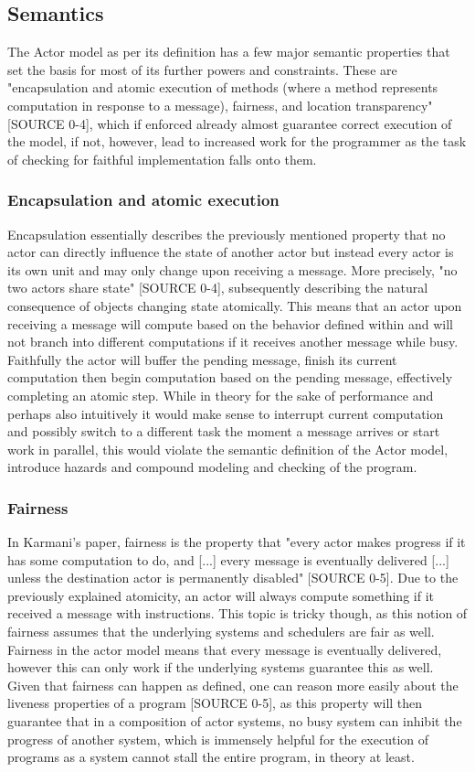 \documentclass[A4]{article}
\begin{document}
\subsection{Semantics}
The Actor model as per its definition has a few major semantic properties that set the basis for most of its further powers and constraints. These are "encapsulation and atomic execution of methods (where a method represents computation in response to a message), fairness, and location transparency" [SOURCE 0-4], which if enforced already almost guarantee correct execution of the model, if not, however, lead to increased work for the programmer as the task of checking for faithful implementation falls onto them. 
\subsubsection{Encapsulation and atomic execution}
Encapsulation essentially describes the previously mentioned property that no actor can directly influence the state of another actor but instead every actor is its own unit and may only change upon receiving a message. More precisely, "no two actors share state" [SOURCE 0-4], subsequently describing the natural consequence of objects changing state atomically. This means that an actor upon receiving a message will compute based on the behavior defined within and will not branch into different computations if it receives another message while busy. Faithfully the actor will buffer the pending message, finish its current computation then begin computation based on the pending message, effectively completing an atomic step. 
While in theory for the sake of performance and perhaps also intuitively it would make sense to interrupt current computation and possibly switch to a different task the moment a message arrives or start work in parallel, this would violate the semantic definition of the Actor model, introduce hazards and compound modeling and checking of the program. 
\subsubsection{Fairness}
In Karmani's paper, fairness is the property that "every actor makes progress if it has some computation to do, and [...] every message is eventually delivered [...] unless the destination actor is permanently disabled" [SOURCE 0-5]. Due to the previously explained atomicity, an actor will always compute something if it received a message with instructions. 
This topic is tricky though, as this notion of fairness assumes that the underlying systems and schedulers are fair as well. Fairness in the actor model means that every message is eventually delivered, however this can only work if the underlying systems guarantee this as well. 
Given that fairness can happen as defined, one can reason more easily about the liveness properties of a program [SOURCE 0-5], as this property will then guarantee that in a composition of actor systems, no busy system can inhibit the progress of another system, which is immensely helpful for the execution of programs as a system cannot stall the entire program, in theory at least. 
\end{document}
